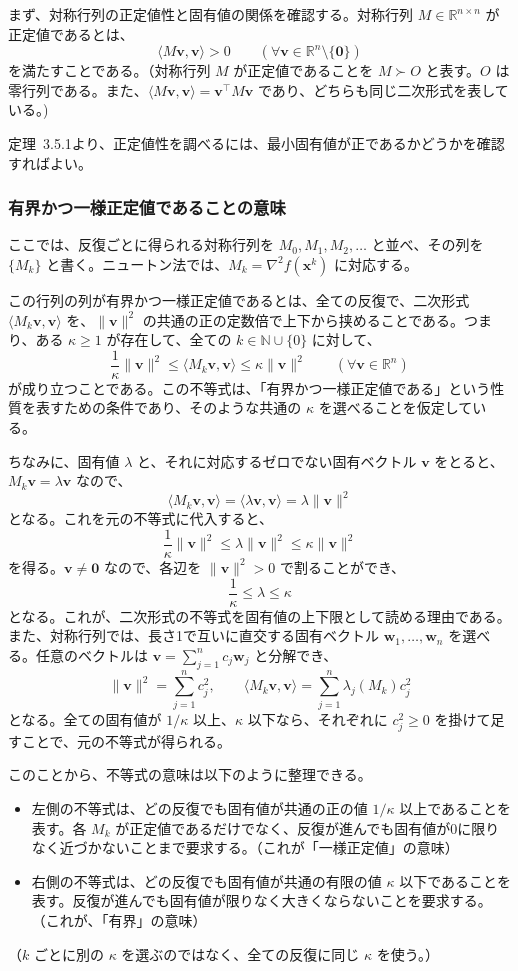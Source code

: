 \documentclass[a4j]{jarticle}
\begin{document}
まず、対称行列の正定値性と固有値の関係を確認する。対称行列 $M\in\mathbb{R}^{n\times n}$ が正定値であるとは、
\[
  \langle M\bm{v},\bm{v}\rangle>0
  \qquad(\forall\bm{v}\in\mathbb{R}^n\setminus\{\bm{0}\})
\]
を満たすことである。（対称行列 $M$ が正定値であることを $M\succ O$ と表す。$O$ は零行列である。また、$\langle M\bm{v},\bm{v}\rangle=\bm{v}^\top M\bm{v}$ であり、どちらも同じ二次形式を表している。)


定理~3.5.1より、正定値性を調べるには、最小固有値が正であるかどうかを確認すればよい。

\subsubsection{有界かつ一様正定値であることの意味}
ここでは、反復ごとに得られる対称行列を $M_0,M_1,M_2,\ldots$ と並べ、その列を $\{M_k\}$ と書く。ニュートン法では、$M_k=\nabla^2f(\bm{x}^k)$ に対応する。

この行列の列が有界かつ一様正定値であるとは、全ての反復で、二次形式 $\langle M_k\bm{v},\bm{v}\rangle$ を、$\|\bm{v}\|^2$ の共通の正の定数倍で上下から挟めることである。つまり、ある $\kappa\ge1$ が存在して、全ての $k\in\mathbb{N}\cup\{0\}$ に対して、
\[
  \frac{1}{\kappa}\|\bm{v}\|^2
  \le\langle M_k\bm{v},\bm{v}\rangle
  \le\kappa\|\bm{v}\|^2
  \qquad(\forall\bm{v}\in\mathbb{R}^n)
\]
が成り立つことである。この不等式は、「有界かつ一様正定値である」という性質を表すための条件であり、そのような共通の $\kappa$ を選べることを仮定している。

ちなみに、固有値 $\lambda$ と、それに対応するゼロでない固有ベクトル $\bm{v}$ をとると、$M_k\bm{v}=\lambda\bm{v}$ なので、
\[
  \langle M_k\bm{v},\bm{v}\rangle
  =\langle\lambda\bm{v},\bm{v}\rangle
  =\lambda\|\bm{v}\|^2
\]
となる。これを元の不等式に代入すると、
\[
  \frac{1}{\kappa}\|\bm{v}\|^2
  \le\lambda\|\bm{v}\|^2
  \le\kappa\|\bm{v}\|^2
\]
を得る。$\bm{v}\ne\bm{0}$ なので、各辺を $\|\bm{v}\|^2>0$ で割ることができ、
\[
  \frac{1}{\kappa}\le\lambda\le\kappa
\]
となる。これが、二次形式の不等式を固有値の上下限として読める理由である。また、対称行列では、長さ1で互いに直交する固有ベクトル $\bm{w}_1,\ldots,\bm{w}_n$ を選べる。任意のベクトルは $\bm{v}=\sum_{j=1}^n c_j\bm{w}_j$ と分解でき、
\[
  \|\bm{v}\|^2=\sum_{j=1}^n c_j^2,\qquad
  \langle M_k\bm{v},\bm{v}\rangle
  =\sum_{j=1}^n\lambda_j(M_k)c_j^2
\]
となる。全ての固有値が $1/\kappa$ 以上、$\kappa$ 以下なら、それぞれに $c_j^2\ge0$ を掛けて足すことで、元の不等式が得られる。

このことから、不等式の意味は以下のように整理できる。
\begin{itemize}
  \item 左側の不等式は、どの反復でも固有値が共通の正の値 $1/\kappa$ 以上であることを表す。各 $M_k$ が正定値であるだけでなく、反復が進んでも固有値が0に限りなく近づかないことまで要求する。（これが「一様正定値」の意味）
  \item 右側の不等式は、どの反復でも固有値が共通の有限の値 $\kappa$ 以下であることを表す。反復が進んでも固有値が限りなく大きくならないことを要求する。（これが、「有界」の意味）
\end{itemize}
（$k$ ごとに別の $\kappa$ を選ぶのではなく、全ての反復に同じ $\kappa$ を使う。）
\end{document}
